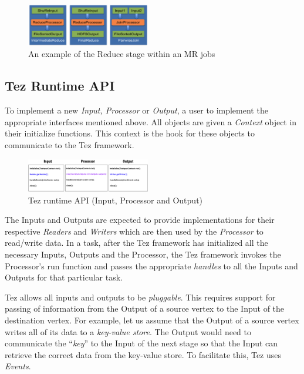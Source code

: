 \documentclass[twocolumn]{article}
\begin{document}
\begin{figure}[htb]
        \centering
        \includegraphics[width=0.48\textwidth]{tez12}
        \caption{An example of the Reduce stage within an MR jobs}
        \label{fig10}
\end{figure}


\subsection{Tez Runtime API}

To implement a new \textit{Input, Processor} or \textit{Output}, a user to implement the
appropriate interfaces mentioned above. All objects are given a \textit{Context}
object in their initialize functions. This context is the hook for these
objects to communicate to the Tez framework. 

\begin{figure}[htb]
        \centering
        \includegraphics[width=0.48\textwidth]{tez32}
        \caption{Tez runtime API (Input, Processor and Output)}
        \label{fig11}
\end{figure}

The Inputs and Outputs are expected to provide implementations for their respective
\textit{Readers} and \textit{Writers} which are then used by the \textit{Processor} to read/write
data. In a task, after the Tez framework has initialized all the
necessary Inputs, Outputs and the Processor, the Tez framework invokes
the Processor's run function and passes the appropriate \textit{handles} to all
the Inputs and Outputs for that particular task.

Tez allows all inputs and outputs to be \emph{pluggable}. This requires
support for passing of information from the Output of a source vertex to
the Input of the destination vertex. For example, let us assume that the
Output of a source vertex writes all of its data to a \emph{key-value
store}. The Output would need to communicate the ``\emph{key}'' to the
Input of the next stage so that the Input can retrieve the correct data
from the key-value store. To facilitate this, Tez uses \emph{Events}.
\end{document}
